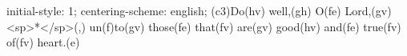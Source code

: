 initial-style: 1;
centering-scheme: english;
(c3)Do(hv) well,(gh) O(fe) Lord,(gv) <sp>*</sp>(,) un(f)to(gv) those(fe) that(fv) are(gv) good(hv) and(fe) true(fv) of(fv) heart.(e)

